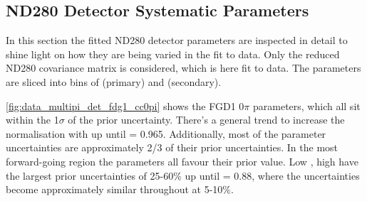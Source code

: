 \subsection{ND280 Detector Systematic Parameters}
In this section the fitted ND280 detector parameters are inspected in detail to shine light on how they are being varied in the fit to data. Only the reduced ND280 covariance matrix is considered, which is here fit to data. The parameters are sliced into bins of \cosmu (primary) and \pmu (secondary).

\autoref{fig:data_multipi_det_fdg1_cc0pi} shows the FGD1 0$\pi$ parameters, which all sit within the 1$\sigma$ of the prior uncertainty. There's a general trend to increase the normalisation with \pmu up until \cosmu= 0.965. Additionally, most of the parameter uncertainties are approximately 2/3 of their prior uncertainties. In the most forward-going region the parameters all favour their prior value. Low \cosmu, high \pmu have the largest prior uncertainties of 25-60\% up until \cosmu= 0.88, where the uncertainties become approximately similar throughout \pmu at 5-10\%.

